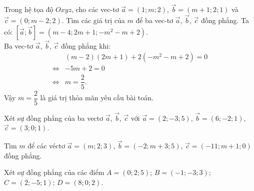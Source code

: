 \begin{vd}%
	Trong hệ tọa độ $Oxyz$, cho các vec-tơ $\overrightarrow{a} = (1;m;2)$, $\overrightarrow{b} = (m+1;2;1)$ và $\overrightarrow{c} = (0;m-2;2)$. Tìm các giá trị của $m$ để ba vec-tơ $\overrightarrow{a}$, $\overrightarrow{b}$, $\overrightarrow{c}$ đồng phẳng.
	\loigiai
	{
		Ta có: $\left[ \overrightarrow{a}; \overrightarrow{b} \right] = \left(m-4; 2m+1; -m^2-m+2\right)$.\\
		Ba vec-tơ $\overrightarrow{a}$, $\overrightarrow{b}$, $\overrightarrow{c}$ đồng phẳng khi:
		\begin{align*}
		& (m-2)(2m+1) + 2(-m^2-m+2) = 0 \\
		\Leftrightarrow & -5m + 2 = 0 \\
		\Leftrightarrow & m = \dfrac{2}{5}.
		\end{align*}
		Vậy $m = \dfrac{2}{5}$ là giá trị thỏa mãn yêu cầu bài toán.
	}
\end{vd}

\begin{vd}%
	Xét sự đồng phẳng của ba vectơ $\vec{a}$, $\vec{b}$, $\vec{c}$ với $\vec{a}=(2;-3;5)$, $\vec{b}=(6;-2;1)$, $\vec{c}=(3;0;1)$.
\end{vd}
\begin{vd}%
	Tìm $m$ để các véctơ $\vec{a}=(m;2;3)$, $\vec{b}=(-2;m+3;5)$, $\vec{c}=(-11;m+1;0)$ đồng phẳng.
\end{vd}
\begin{vd}%
	Xét sự đồng phẳng của các điểm $A=(0;2;5)$; $B=(-1;-3;3)$; $C=(2;-5;1)$; $D=(8;0;2)$.
\end{vd}

